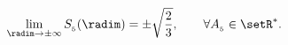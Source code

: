 \begin{equation}
\lim_{\radim\to\pm\infty} S_{_5}(\radim) = \pm \sqrt{2\over 3}, \qquad
\forall A_{_5} \in \setR^*.
\label{inf5}
\end{equation}

